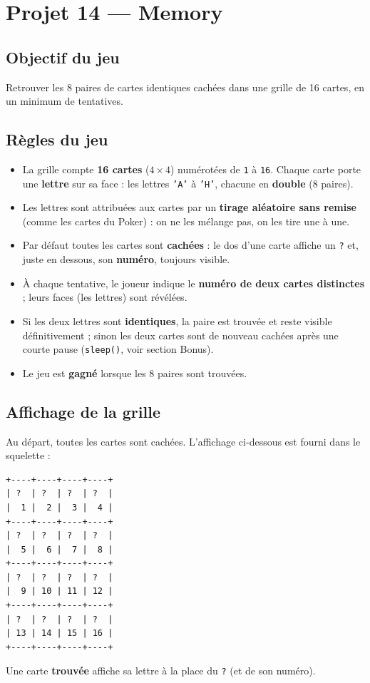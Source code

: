 \section{Projet 14 — Memory}

\subsection*{Objectif du jeu}
Retrouver les 8 paires de cartes identiques cachées dans une grille de 16 cartes, en un minimum de tentatives.

\subsection*{Règles du jeu}
\begin{itemize}
  \item La grille compte \textbf{16 cartes} ($4\times4$) numérotées de \texttt{1} à \texttt{16}. Chaque carte porte une \textbf{lettre} sur sa face : les lettres \texttt{'A'} à \texttt{'H'}, chacune en \textbf{double} (8 paires).
  \item Les lettres sont attribuées aux cartes par un \textbf{tirage aléatoire sans remise} (comme les cartes du Poker) : on ne les mélange pas, on les tire une à une.
  \item Par défaut toutes les cartes sont \textbf{cachées} : le dos d'une carte affiche un \texttt{?} et, juste en dessous, son \textbf{numéro}, toujours visible.
  \item À chaque tentative, le joueur indique le \textbf{numéro de deux cartes distinctes} ; leurs faces (les lettres) sont révélées.
  \item Si les deux lettres sont \textbf{identiques}, la paire est trouvée et reste visible définitivement ; sinon les deux cartes sont de nouveau cachées après une courte pause (\texttt{sleep()}, voir section Bonus).
  \item Le jeu est \textbf{gagné} lorsque les 8 paires sont trouvées.
\end{itemize}

\subsection*{Affichage de la grille}
Au départ, toutes les cartes sont cachées. L'affichage ci-dessous est fourni dans le squelette :
\begin{lstlisting}[basicstyle=\ttfamily\small,numbers=none]
+----+----+----+----+
| ?  | ?  | ?  | ?  |
|  1 |  2 |  3 |  4 |
+----+----+----+----+
| ?  | ?  | ?  | ?  |
|  5 |  6 |  7 |  8 |
+----+----+----+----+
| ?  | ?  | ?  | ?  |
|  9 | 10 | 11 | 12 |
+----+----+----+----+
| ?  | ?  | ?  | ?  |
| 13 | 14 | 15 | 16 |
+----+----+----+----+
\end{lstlisting}
Une carte \textbf{trouvée} affiche sa lettre à la place du \texttt{?} (et de son numéro).

